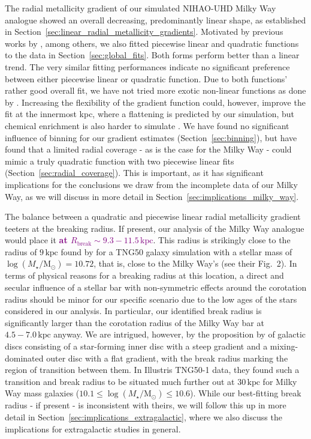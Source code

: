 \documentclass[twocolumn,apj,numberedappendix,appendixfloats,twocolappendix]{openjournal}
\newcommand{\adjusted}[1]{\textbf{\textcolor{purple}{#1}}}
\begin{document}
\begin{CJK*}{UTF8}{gbsn}
The radial metallicity gradient of our simulated NIHAO-UHD Milky Way analogue showed an overall decreasing, predominantly linear shape, as established in Section~\ref{sec:linear_radial_metallicity_gradients}. Motivated by previous works by \citet{SanchezMenguiano2016}, among others, we also fitted piecewise linear and quadratic functions to the data in Section~\ref{sec:global_fits}. Both forms perform better than a linear trend. The very similar fitting performances indicate no significant preference between either piecewise linear or quadratic function. Due to both functions' rather good overall fit, we have not tried more exotic non-linear functions as done by \citet{Scarano2013}. Increasing the flexibility of the gradient function could, however, improve the fit at the innermost kpc, where a flattening is predicted by our simulation, but chemical enrichment is also harder to simulate \citep[see also][]{Minchev2013, Sun2024}. We have found no significant influence of binning for our gradient estimates (Section~\ref{sec:binning}), but have found that a limited radial coverage - as is the case for the Milky Way - could mimic a truly quadratic function with two piecewise linear fits (Section~\ref{sec:radial_coverage}). This is important, as it has significant implications for the conclusions we draw from the incomplete data of our Milky Way, as we will discuss in more detail in Section~\ref{sec:implications_milky_way}.

The balance between a quadratic and piecewise linear radial metallicity gradient teeters at the breaking radius. If present, our analysis of the Milky Way analogue would place it \adjusted{at $R_\mathrm{break} \sim 9.3-11.5\,\mathrm{kpc}$}. This radius is strikingly close to the radius of $9\,\mathrm{kpc}$ found by \citet{Hemler2021} for a TNG50 galaxy simulation with a stellar mass of $\log(M_\star/\mathrm{M_\odot}) = 10.72$, that is, close to the Milky Way's (see their Fig.~2). In terms of physical reasons for a breaking radius at this location, a direct and secular influence of a stellar bar with non-symmetric effects around the corotation radius \citep{DiMatteo2013, Scarano2013} should be minor for our specific scenario due to the low ages of the stars considered in our analysis. In particular, our identified break radius is significantly larger than the corotation radius of the Milky Way bar at $4.5-7.0\,\mathrm{kpc}$ \citep[][and references therein]{BlandHawthorn_Gerhard2016} anyway. We are intrigued, however, by the proposition by \citet{Garcia2023} of galactic discs consisting of a star-forming inner disc with a steep gradient and a mixing-dominated outer disc with a flat gradient, with the break radius marking the region of transition between them. In Illustris TNG50-1 data, they found such a transition and break radius to be situated much further out at $30\,\mathrm{kpc}$ for Milky Way mass galaxies ($10.1 \leq \log(M_\star/\mathrm{M_\odot}) \leq 10.6$). While our best-fitting break radius - if present - is inconsistent with theirs, we will follow this up in more detail in Section~\ref{sec:implications_extragalactic}, where we also discuss the implications for extragalactic studies in general.


\end{CJK*}
\end{document}
